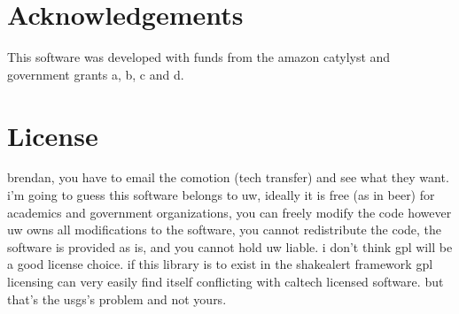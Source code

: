 \documentclass[12pt]{article}
\begin{document}
\section{Acknowledgements}
This software was developed with funds from the amazon catylyst and government grants a, b, c and d.  

\appendix
\section{License}\label{s:license}
brendan, you have to email the comotion (tech transfer) and see what they want.  
i'm going to guess this software belongs to uw, ideally it is free (as in beer) 
for academics and government organizations, you can freely modify the code however uw owns 
all modifications to the software, you cannot redistribute the code, the software
is provided as is, and you cannot hold uw liable.  i don't think gpl will be a good license
choice.  if this library is to exist in the shakealert framework gpl licensing can very easily 
find itself conflicting with caltech licensed software.  but that's the usgs's problem and not yours.   
\end{document}
